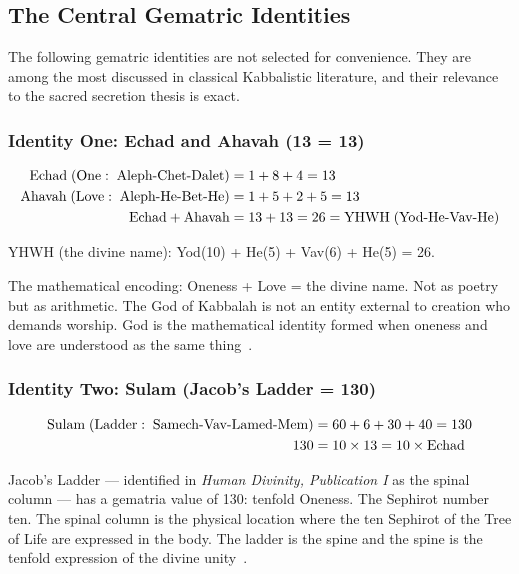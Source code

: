 \documentclass[12pt, a4paper]{article}
\begin{document}
\subsection{The Central Gematric Identities}

The following gematric identities are not selected for convenience. They are
among the most discussed in classical Kabbalistic literature, and their
relevance to the sacred secretion thesis is exact.

\subsubsection{Identity One: Echad and Ahavah (13 = 13)}

\begin{align}
\text{Echad} \; (\text{One}: \;\text{Aleph-Chet-Dalet}) &= 1 + 8 + 4 = 13 \notag \\
\text{Ahavah} \; (\text{Love}: \;\text{Aleph-He-Bet-He}) &= 1 + 5 + 2 + 5 = 13 \notag \\
\text{Echad} + \text{Ahavah} &= 13 + 13 = 26 = \text{YHWH} \; (\text{Yod-He-Vav-He}) \notag
\end{align}

YHWH (the divine name): Yod(10) + He(5) + Vav(6) + He(5) = 26.

The mathematical encoding: Oneness + Love = the divine name. Not as poetry
but as arithmetic. The God of Kabbalah is not an entity external to creation
who demands worship. God is the mathematical identity formed when oneness and
love are understood as the same thing~\autocite{blumenthal2006}.

\subsubsection{Identity Two: Sulam (Jacob's Ladder = 130)}

\begin{align}
\text{Sulam} \; (\text{Ladder}: \;\text{Samech-Vav-Lamed-Mem}) &= 60 + 6 + 30 + 40 = 130 \notag \\
130 &= 10 \times 13 = 10 \times \text{Echad} \notag
\end{align}

Jacob's Ladder — identified in \emph{Human Divinity, Publication I} as the spinal
column — has a gematria value of 130: tenfold Oneness. The Sephirot number
ten. The spinal column is the physical location where the ten Sephirot of the
Tree of Life are expressed in the body. The ladder is the spine and the spine
is the tenfold expression of the divine unity~\autocite{scholem1974}.
\end{document}
